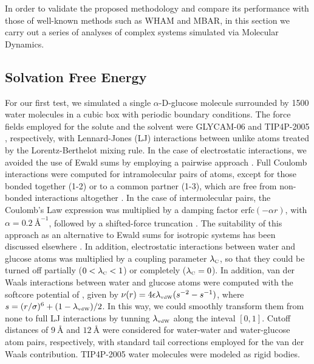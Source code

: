 \documentclass[
    journal=jctcce,
    layout=twocolumn
]{achemso}
\begin{document}
In order to validate the proposed methodology and compare its performance with those of well-known methods such as WHAM and MBAR, in this section we carry out a series of analyses of complex systems simulated via Molecular Dynamics.

\subsection{Solvation Free Energy}
\label{sec:solvation free energy}

For our first test, we simulated a single \mbox{$\alpha$-D-glucose} molecule surrounded by 1500 water molecules in a cubic box with periodic boundary conditions. The force fields employed for the solute and the solvent were GLYCAM-06 \cite{Kirschner_2007} and TIP4P-2005 \cite{Abascal_2005}, respectively, with Lennard-Jones (LJ) interactions between unlike atoms treated by the Lorentz-Berthelot mixing rule. In the case of electrostatic interactions, we avoided the use of Ewald sums by employing a pairwise approach \cite{Fennell_2006}. Full Coulomb interactions were computed for intramolecular pairs of atoms, except for those bonded together (\mbox{1-2}) or to a common partner (\mbox{1-3}), which are free from non-bonded interactions altogether \cite{Kirschner_2007}. In the case of intermolecular pairs, the Coulomb's Law expression was multiplied by a damping factor $\text{erfc}(-\alpha r)$, with $\alpha = 0.2~\text{\AA}^{-1}$, followed by a shifted-force truncation \cite{Allen_1987}. The suitability of this approach as an alternative to Ewald sums for isotropic systems has been discussed elsewhere \cite{Fennell_2006}. In addition, electrostatic interactions between water and glucose atoms was multiplied by a coupling parameter $\lambda_\text{\tiny C}$, so that they could be turned off partially ($0 < \lambda_\text{\tiny C} < 1$) or completely ($\lambda_\text{\tiny C} = 0$). In addition, van der Waals interactions between water and glucose atoms were computed with the softcore potential of \citeauthor{Beutler_1994} \cite{Beutler_1994}, given by $\nu(r) = 4 \epsilon \lambda_\text{\tiny vdW} (s^{-2} - s^{-1})$, where $s = (r/\sigma)^6 + (1 - \lambda_\text{\tiny vdW})/2$. In this way, we could smoothly transform them from none to full LJ interactions by tunning $\lambda_\text{\tiny vdW}$ along the inteval $[0,1]$. Cutoff distances of $9~\text{\AA}$ and $12~\text{\AA}$ were considered for water-water and water-glucose atom pairs, respectively, with standard tail corrections employed for the van der Waals contribution. TIP4P-2005 \cite{Abascal_2005} water molecules were modeled as rigid bodies.
\end{document}
